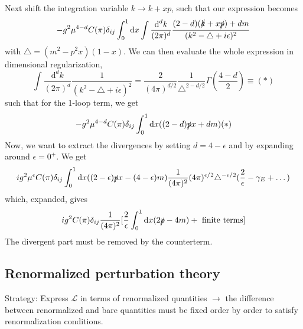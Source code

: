 \documentclass[a4paper]{book}
\theoremstyle{definition}
\theoremstyle{remark}
\begin{document}
Next shift the integration variable $k\rightarrow k + xp$, such that our expression becomes 
\begin{equation}
    -g^2 \mu^{4-d} C(\pi)\delta_{ij} \int_0^1 \text{d}x \int\frac{\text{d}^dk}{(2\pi)^d}\frac{(2-d)(\slashed{k} + x\slashed{p}) + dm}{(k^2 - \triangle + i\epsilon)^2}
\end{equation}
with $\triangle = (m^2 - p^2x)(1-x)$. We can then evaluate the whole expression in dimensional regularization, 
\begin{equation}
    \int\frac{\text{d}^dk}{(2\pi)^d}\frac{1}{(k^2 - \triangle + i\epsilon)^2} = \frac{2}{(4\pi)^{d/2}} \frac{1}{\triangle^{2-d/2}}\Gamma(\frac{4-d}{2}) \equiv (*)
\end{equation}
such that for the 1-loop term, we get 
\begin{equation}
    -g^2 \mu^{4-d} C(\pi) \delta_{ij} \int_0^1 \text{d}x ((2-d)\slashed{p}x + dm) (*)
\end{equation}
Now, we want to extract the divergences by setting $d = 4-\epsilon$ and by expanding around $\epsilon = 0^+$. We get
\begin{equation}
    ig^2 \mu^\epsilon C(\pi) \delta_{ij} \int_0^1 \text{d}x ((2-\epsilon )\slashed{p}x- (4-\epsilon)m)\frac{1}{(4\pi)^2}(4\pi)^{\epsilon/2} \triangle^{-\epsilon/2} (\frac{2}{\epsilon} - \gamma_E + \dots)
\end{equation}
which, expanded, gives 
\begin{equation}
    ig^2 C(\pi)\delta_{ij} \frac{1}{(4\pi)^2} [\frac{2}{\epsilon}\int_0^1 \text{d}x (2\slashed{p} - 4m) + \text{ finite terms}]
\end{equation}
The divergent part must be removed by the counterterm. 

\subsection{Renormalized perturbation theory}
Strategy: Express $\mathcal L$ in terms of renormalized quantities $\rightarrow$ the difference between renormalized and bare quantities must be fixed order by order to satisfy renormalization conditions. 
\end{document}
